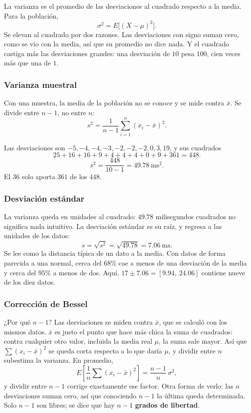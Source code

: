\documentclass[11pt,letterpaper]{article}
\begin{document}
La varianza es el promedio de las desviaciones al cuadrado respecto a
la media. Para la población,
\[
    \sigma^2 = E\big[(X - \mu)^2\big] .
\]
Se elevan al cuadrado por dos razones. Las desviaciones con signo
suman cero, como se vio con la media, así que su promedio no dice
nada. Y el cuadrado castiga más las desviaciones grandes: una
desviación de $10$ pesa $100$, cien veces más que una de $1$.

\subsubsection*{Varianza muestral}

Con una muestra, la media de la población no se conoce y se mide
contra $\bar{x}$. Se divide entre $n - 1$, no entre $n$:
\[
    s^2 = \frac{1}{n - 1} \sum_{i=1}^{n} (x_i - \bar{x})^2 .
\]

\begin{ejemplo}
    Las desviaciones son $-5, -4, -4, -3, -2, -2, -2, 0, 3, 19$, y sus
    cuadrados
    \[
        25 + 16 + 16 + 9 + 4 + 4 + 4 + 0 + 9 + 361 = 448 .
    \]
    \[
        s^2 = \frac{448}{10 - 1} = 49.78 \ \text{ms}^2 .
    \]
    El $36$ solo aporta $361$ de los $448$.
\end{ejemplo}

\subsubsection*{Desviación estándar}

La varianza queda en unidades al cuadrado: $49.78$ milisegundos
cuadrados no significa nada intuitivo. La desviación estándar es su
raíz, y regresa a las unidades de los datos:
\[
    s = \sqrt{s^2} = \sqrt{49.78} = 7.06 \ \text{ms} .
\]
Se lee como la distancia típica de un dato a la media. Con datos de
forma parecida a una normal, cerca del $68\%$ cae a menos de una
desviación de la media y cerca del $95\%$ a menos de dos. Aquí,
$17 \pm 7.06 = [9.94,\ 24.06]$ contiene nueve de los diez datos.

\subsubsection*{Corrección de Bessel}

¿Por qué $n - 1$? Las desviaciones se miden contra $\bar{x}$, que se
calculó con los mismos datos. $\bar{x}$ es justo el punto que hace más
chica la suma de cuadrados: contra cualquier otro valor, incluida la
media real $\mu$, la suma sale mayor. Así que $\sum (x_i - \bar{x})^2$
se queda corta respecto a lo que daría $\mu$, y dividir entre $n$
subestima la varianza. En promedio,
\[
    E\left[ \frac{1}{n} \sum (x_i - \bar{x})^2 \right]
    = \frac{n - 1}{n}\, \sigma^2 ,
\]
y dividir entre $n - 1$ corrige exactamente ese factor. Otra forma de
verlo: las $n$ desviaciones suman cero, así que conociendo $n - 1$ la
última queda determinada. Solo $n - 1$ son libres; se dice que hay
$n - 1$ \textbf{grados de libertad}.
\end{document}
